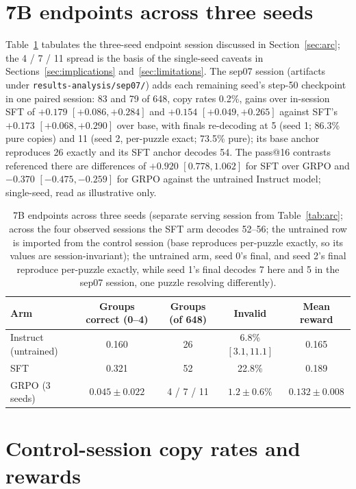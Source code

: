 \documentclass{article}
\begin{document}
\section{7B endpoints across three seeds}
\label{app:endpoints}

Table~\ref{tab:endpoints} tabulates the three-seed endpoint session
discussed in Section~\ref{sec:arc}; the 4 / 7 / 11 spread is the basis of
the single-seed caveats in Sections~\ref{sec:implications}
and~\ref{sec:limitations}. The sep07 session (artifacts under \texttt{results-analysis/sep07/}) adds each remaining seed's step-50 checkpoint in one paired session: 83 and 79 of 648, copy rates 0.2\%, gains over in-session SFT of $+0.179$ $[+0.086, +0.284]$ and $+0.154$ $[+0.049, +0.265]$ against SFT's $+0.173$ $[+0.068, +0.290]$ over base, with finals re-decoding at 5 (seed 1; 86.3\% pure copies) and 11 (seed 2, per-puzzle exact; 73.5\% pure); its base anchor reproduces 26 exactly and its SFT anchor decodes 54. The pass@16 contrasts referenced there are
differences of $+0.920$ $[0.778, 1.062]$ for SFT over GRPO and $-0.370$
$[-0.475, -0.259]$ for GRPO against the untrained Instruct model;
single-seed, read as illustrative only.

\begin{table}[h]
\centering
\caption{7B endpoints across three seeds (separate serving session from Table~\ref{tab:arc}; across the four observed sessions the SFT arm decodes 52--56; the untrained row is imported from the control session (base reproduces per-puzzle exactly, so its values are session-invariant); the untrained arm, seed 0's final, and seed 2's final reproduce per-puzzle exactly, while seed 1's final decodes 7 here and 5 in the sep07 session, one puzzle resolving differently).}
\label{tab:endpoints}
\small
\setlength{\tabcolsep}{4pt}
\begin{tabular}{lcccc}
\toprule
Arm & Groups correct (0--4) & Groups (of 648) & Invalid & Mean reward \\
\midrule
Instruct (untrained) & 0.160 & 26 & 6.8\% $[3.1, 11.1]$ & 0.165 \\
SFT   & 0.321 & 52 & 22.8\% & 0.189 \\
GRPO (3 seeds) & $0.045 \pm 0.022$ & 4 / 7 / 11 & $1.2 \pm 0.6$\% & $0.132 \pm 0.008$ \\
\bottomrule
\end{tabular}
\end{table}

\section{Control-session copy rates and rewards}
\label{app:copy}
\end{document}
